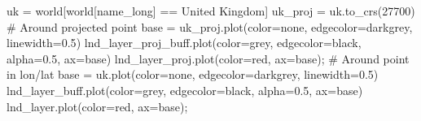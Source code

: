 \documentclass[
  letterpaper,
]{krantz}
\newenvironment{Shaded}{\begin{snugshade}}{\end{snugshade}}
\newcommand{\CommentTok}[1]{\textcolor[rgb]{0.37,0.37,0.37}{#1}}
\newcommand{\DecValTok}[1]{\textcolor[rgb]{0.68,0.00,0.00}{#1}}
\newcommand{\FloatTok}[1]{\textcolor[rgb]{0.68,0.00,0.00}{#1}}
\newcommand{\NormalTok}[1]{\textcolor[rgb]{0.00,0.23,0.31}{#1}}
\newcommand{\OperatorTok}[1]{\textcolor[rgb]{0.37,0.37,0.37}{#1}}
\newcommand{\StringTok}[1]{\textcolor[rgb]{0.13,0.47,0.30}{#1}}
\begin{document}
\begin{Shaded}
\begin{Highlighting}[]
\NormalTok{uk }\OperatorTok{=}\NormalTok{ world[world[}\StringTok{\textquotesingle{}name\_long\textquotesingle{}}\NormalTok{] }\OperatorTok{==} \StringTok{\textquotesingle{}United Kingdom\textquotesingle{}}\NormalTok{]}
\NormalTok{uk\_proj }\OperatorTok{=}\NormalTok{ uk.to\_crs(}\DecValTok{27700}\NormalTok{)}
\CommentTok{\# Around projected point}
\NormalTok{base }\OperatorTok{=}\NormalTok{ uk\_proj.plot(color}\OperatorTok{=}\StringTok{\textquotesingle{}none\textquotesingle{}}\NormalTok{, edgecolor}\OperatorTok{=}\StringTok{\textquotesingle{}darkgrey\textquotesingle{}}\NormalTok{, linewidth}\OperatorTok{=}\FloatTok{0.5}\NormalTok{)}
\NormalTok{lnd\_layer\_proj\_buff.plot(color}\OperatorTok{=}\StringTok{\textquotesingle{}grey\textquotesingle{}}\NormalTok{, edgecolor}\OperatorTok{=}\StringTok{\textquotesingle{}black\textquotesingle{}}\NormalTok{, alpha}\OperatorTok{=}\FloatTok{0.5}\NormalTok{, ax}\OperatorTok{=}\NormalTok{base)}
\NormalTok{lnd\_layer\_proj.plot(color}\OperatorTok{=}\StringTok{\textquotesingle{}red\textquotesingle{}}\NormalTok{, ax}\OperatorTok{=}\NormalTok{base)}\OperatorTok{;}
\CommentTok{\# Around point in lon/lat}
\NormalTok{base }\OperatorTok{=}\NormalTok{ uk.plot(color}\OperatorTok{=}\StringTok{\textquotesingle{}none\textquotesingle{}}\NormalTok{, edgecolor}\OperatorTok{=}\StringTok{\textquotesingle{}darkgrey\textquotesingle{}}\NormalTok{, linewidth}\OperatorTok{=}\FloatTok{0.5}\NormalTok{)}
\NormalTok{lnd\_layer\_buff.plot(color}\OperatorTok{=}\StringTok{\textquotesingle{}grey\textquotesingle{}}\NormalTok{, edgecolor}\OperatorTok{=}\StringTok{\textquotesingle{}black\textquotesingle{}}\NormalTok{, alpha}\OperatorTok{=}\FloatTok{0.5}\NormalTok{, ax}\OperatorTok{=}\NormalTok{base)}
\NormalTok{lnd\_layer.plot(color}\OperatorTok{=}\StringTok{\textquotesingle{}red\textquotesingle{}}\NormalTok{, ax}\OperatorTok{=}\NormalTok{base)}\OperatorTok{;}
\end{Highlighting}
\end{Shaded}
\end{document}
